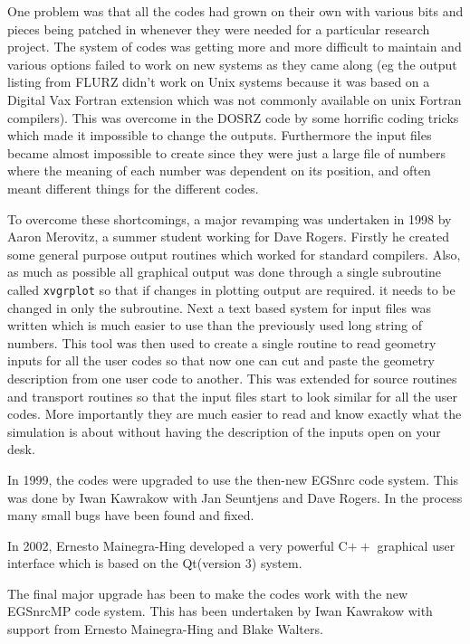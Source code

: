 \documentclass[12pt,twoside]{article}  %
\begin{document}
One problem was that
all the codes had grown on their own with various bits and pieces being
patched in whenever they were needed for a particular research project.
The system of codes was getting more and more difficult to maintain
and various options failed to work on new systems as they came along
(eg the output listing from FLURZ didn't work on Unix systems
because it was based on a
Digital Vax Fortran extension which was not commonly available on unix
Fortran compilers).  This was overcome in the DOSRZ code by some horrific
coding tricks which made it impossible to change the outputs.  Furthermore the
input files became almost impossible to create since they were just a
large file of numbers where the meaning of each number was dependent on
its position, and often meant different things for the different codes.

To overcome these shortcomings, a major revamping was undertaken in 1998
by Aaron Merovitz, a summer student working for Dave Rogers.  Firstly he
created some general purpose output routines which worked for standard
compilers. Also, as much as possible all graphical output was done through
a single subroutine called {\tt xvgrplot} so that if changes in plotting
output are required. it needs to be changed in only the subroutine.
Next a text based system for input files was written which is much easier
to use than the previously used long string of numbers.  This tool was
then used to create a single routine to read geometry inputs for all the
user codes so that now one can cut and paste the geometry description
from one user code to another. This was extended for source routines and
transport routines so that the input files start to look similar for all
the user codes.  More importantly they are much easier to read and know
exactly what the simulation is about without having the description of
the inputs open on your desk.

In 1999, the codes were upgraded to use the then-new EGSnrc code system.
This was done by Iwan Kawrakow with Jan Seuntjens and Dave Rogers.
In the process many small bugs have been found and fixed.

In 2002, Ernesto Mainegra-Hing developed a very powerful C$++$ graphical
user interface which is based on the Qt(version 3) system\cite{Ma03}.

The final major upgrade has been to make the codes work with the new
EGSnrcMP code system. This has been undertaken by Iwan Kawrakow with
support from Ernesto Mainegra-Hing and Blake Walters.
\end{document}
